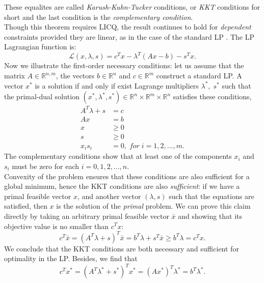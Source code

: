 \documentclass[a4paper,10 pt,titlepage,twoside]{book}
\theoremstyle{plain}
\theoremstyle{definition}
\theoremstyle{remark}
\begin{document}
These equalites are called \textit{Karush-Kuhn-Tucker} conditions, or \textit{KKT} conditions for short and the last condition is the \textit{complementary condition}.\\ Though this theorem requires LICQ, the result continues to hold for \textit{dependent} constraints provided they are linear, as in the case of the standard LP \cite{W}. The LP Lagrangian function is:\\
\begin{equation}
\mathcal{L}(x,\lambda,s)=c^{T}x-\lambda^{T}\left(Ax-b\right)-s^{T}x.
\end{equation}
Now we illustrate the first-order necessary conditions: let us assume that the matrix $A\in\mathbb{R}^{n,m}$, the vectors $b\in\mathbb{R}^{n}$ and $c\in\mathbb{R}^{m}$ construct a standard LP. A vector $x^{*}$ is a solution if and only if exist Lagrange multipliers $\lambda^{*},\;s^{*}$ such that the primal-dual solution $\left( x^{*},\lambda^{*},s^{*}\right)\in\mathbb{R}^{n}\times\mathbb{R}^{m}\times\mathbb{R}^{n}$ satisfies these conditions, 
\begin{align}
A^{T}\lambda+s&=c\\ \label{(Cost)}
Ax&=b\\ \label{SF}
x&\geq 0\\
s&\geq 0\\
x_{i}s_{i}&=0,\; for\;i= 1,2,...,m. \label{CC}
\end{align} 
The complementary conditions show that at least one of the components $x_{i}$ and $s_{i}$ must be zero for each $i=0,1,2,...,n$.\\
 Convexity of the problem ensures that these conditions are also sufficient for a global minimum, hence the KKT conditions are also \textit{sufficient}: if we have a primal feasible vector $x$, and another vector $(\lambda, s)$ such that the equations are satisfied, then $x$ is the solution of the \textit{primal} problem. We can prove this claim directly by taking an arbitrary primal feasible vector $\bar{x}$ and showing that its objective value is no smaller than $c^{T}x$:
\begin{equation*}
c^{T}\bar{x}=(A^{T}\lambda+s)^{T}\bar{x}=b^{T}\lambda+s^{T}\bar{x}\geq b^{T}\lambda= c^{T}x.
\end{equation*}
We conclude that the KKT conditions are both necessary and sufficient for optimality in the LP. Besides, we find that
\begin{equation*}
	c^{T}x^{*}=\left(A^{T}\lambda^{*}+s^{*}\right)^{T}x^{*}=\left(Ax^{*}\right)^{T}\lambda^{*}=b^{T}\lambda^{*}.
\end{equation*}
\end{document}
